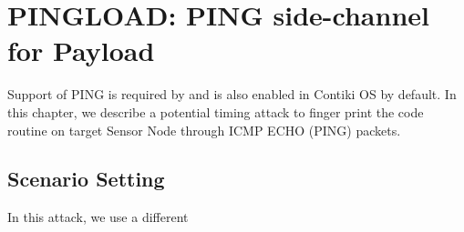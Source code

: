 \chapter{PINGLOAD: PING side-channel for Payload } \label{Chp: PINGLOAD}

Support of PING is required by \cite{rfc1122} and is also enabled in Contiki OS by default. In this chapter, we describe a potential timing attack to finger print the code routine on target Sensor Node through ICMP ECHO (PING) packets.

\section{Scenario Setting}

In this attack, we use a different 


%
%
%
%
